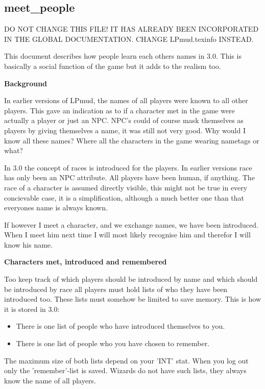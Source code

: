 \subsection{meet\_people}

DO NOT CHANGE THIS FILE! IT HAS ALREADY BEEN INCORPORATED IN THE GLOBAL
DOCUMENTATION. CHANGE LPmud.texinfo INSTEAD.

This document describes how people learn each others names in 3.0. This is
basically a social function of the game but it adds to the realism too.

{\bf Background}

In earlier versions of LPmud, the names of all players were known to all other
players. This gave an indication as to if a character met in the game were
actually a player or just an NPC. NPC's could of course mask themselves as
players by giving themselves a name, it was still not very good. Why would I
know all these names? Where all the characters in the game wearing nametags
or what?

In 3.0 the concept of races is introduced for the players. In earlier versions
race has only been an NPC attribute. All players have been human, if anything.
The race of a character is assumed directly visible, this might not be true
in every concievable case, it is a simplification, although a much better one 
than that everyones name is always known.

If however I meet a character, and we exchange names, we have been introduced.
When I meet him next time I will most likely recognise him and therefor I will
know his name. 

{\bf Characters met, introduced and remembered}

Too keep track of which players should be introduced by name and which should
be introduced by race all players must hold lists of who they have been
introduced too. These lists must somehow be limited to save memory. This is
how it is stored in 3.0:

\begin{itemize}
    \item  There is one list of people who have introduced themselves to you.
    \item  There is one list of people who you have chosen to remember.
\end{itemize}

The maximum size of both lists depend on your 'INT' stat. When you log out
only the 'remember'-list is saved. Wizards do not have such lists, they always
know the name of all players. 

